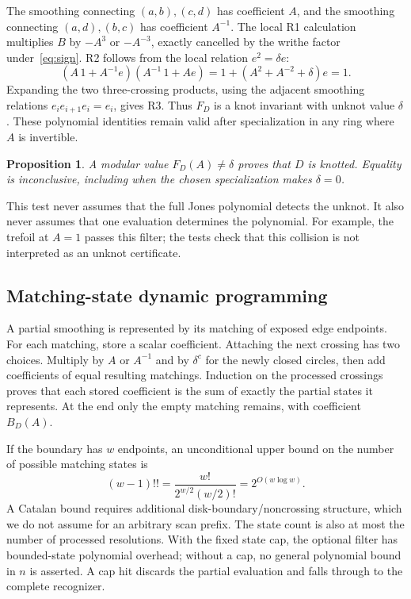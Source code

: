 \documentclass[11pt]{article}
\newtheorem{proposition}[theorem]{Proposition}
\theoremstyle{definition}\newtheorem{definition}[theorem]{Definition}
\theoremstyle{remark}\newtheorem{remark}[theorem]{Remark}
\begin{document}
The smoothing connecting $(a,b),(c,d)$ has coefficient $A$, and the smoothing
connecting $(a,d),(b,c)$ has coefficient $A^{-1}$. The local R1 calculation
multiplies $B$ by $-A^3$ or $-A^{-3}$, exactly cancelled by the writhe factor
under~\eqref{eq:sign}. R2 follows from the local relation $e^2=\delta e$:
\[
 (A\,1+A^{-1}e)(A^{-1}\,1+Ae)
 =1+(A^2+A^{-2}+\delta)e=1.
\]
Expanding the two three-crossing products, using the adjacent smoothing
relations $e_i e_{i+1}e_i=e_i$, gives R3. Thus $F_D$ is a knot invariant with
unknot value $\delta$. These polynomial identities remain valid after
specialization in any ring where $A$ is invertible.

\begin{proposition}\label{prop:jonesfilter}
A modular value $F_D(A)\ne\delta$ proves that $D$ is knotted. Equality is
inconclusive, including when the chosen specialization makes $\delta=0$.
\end{proposition}
This test never assumes that the full Jones polynomial detects the unknot.
It also never assumes that one evaluation determines the polynomial. For
example, the trefoil at $A=1$ passes this filter; the tests check that this
collision is not interpreted as an unknot certificate.

\subsection{Matching-state dynamic programming}
A partial smoothing is represented by its matching of exposed edge endpoints.
For each matching, store a scalar coefficient. Attaching the next crossing has
two choices. Multiply by $A$ or $A^{-1}$ and by $\delta^c$ for the newly
closed circles, then add coefficients of equal resulting matchings. Induction
on the processed crossings proves that each stored coefficient is the sum of
exactly the partial states it represents. At the end only the empty matching
remains, with coefficient $B_D(A)$.

If the boundary has $w$ endpoints, an unconditional upper bound on the number
of possible matching states is
\[
 (w-1)!!=\frac{w!}{2^{w/2}(w/2)!}=2^{O(w\log w)}.
\]
A Catalan bound requires additional disk-boundary/noncrossing structure, which
we do not assume for an arbitrary scan prefix. The state count is also at most
the number of processed resolutions. With the fixed state cap, the optional
filter has bounded-state polynomial overhead; without a cap, no general
polynomial bound in $n$ is asserted. A cap hit discards the partial evaluation
and falls through to the complete recognizer.
\end{document}
